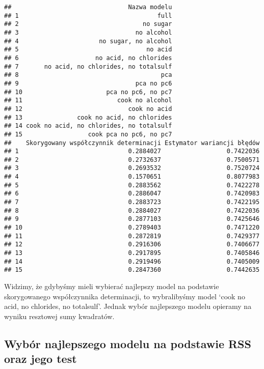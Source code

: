 \documentclass[
]{article}
\begin{document}
\begin{verbatim}
##                                Nazwa modelu
## 1                                      full
## 2                                  no sugar
## 3                                no alcohol
## 4                      no sugar, no alcohol
## 5                                   no acid
## 6                     no acid, no chlorides
## 7       no acid, no chlorides, no totalsulf
## 8                                       pca
## 9                                pca no pc6
## 10                       pca no pc6, no pc7
## 11                          cook no alcohol
## 12                             cook no acid
## 13               cook no acid, no chlorides
## 14 cook no acid, no chlorides, no totalsulf
## 15                  cook pca no pc6, no pc7
##    Skorygowany współczynnik determinacji Estymator wariancji błędów
## 1                              0.2884027                  0.7422036
## 2                              0.2732637                  0.7500571
## 3                              0.2693532                  0.7520724
## 4                              0.1570651                  0.8077983
## 5                              0.2883562                  0.7422278
## 6                              0.2886047                  0.7420983
## 7                              0.2883723                  0.7422195
## 8                              0.2884027                  0.7422036
## 9                              0.2877103                  0.7425646
## 10                             0.2789403                  0.7471220
## 11                             0.2872819                  0.7429377
## 12                             0.2916306                  0.7406677
## 13                             0.2917895                  0.7405846
## 14                             0.2919496                  0.7405009
## 15                             0.2847360                  0.7442635
\end{verbatim}

Widzimy, że gdybyśmy mieli wybierać najlepszy model na podstawie
skorygowanego współczynnika determinacji, to wybralibyśmy model `cook no
acid, no chlorides, no totalsulf'. Jednak wybór najlepszego modelu
opieramy na wyniku resztowej sumy kwadratów.

\subsection{Wybór najlepszego modelu na podstawie RSS oraz jego
test}\label{wybuxf3r-najlepszego-modelu-na-podstawie-rss-oraz-jego-test}
\end{document}
